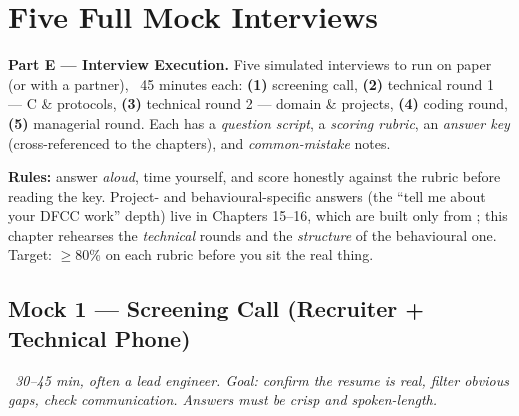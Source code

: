 \chapter{Five Full Mock Interviews}
\label{ch:mock-interviews}

\begin{partnote}
\textbf{Part E --- Interview Execution.} Five simulated interviews to run on
paper (or with a partner), ~45 minutes each: \textbf{(1)} screening call,
\textbf{(2)} technical round 1 --- C \& protocols, \textbf{(3)} technical round 2
--- domain \& projects, \textbf{(4)} coding round, \textbf{(5)} managerial round.
Each has a \emph{question script}, a \emph{scoring rubric}, an \emph{answer key}
(cross-referenced to the chapters), and \emph{common-mistake} notes.

\medskip
\textbf{Rules:} answer \emph{aloud}, time yourself, and score honestly against
the rubric before reading the key. Project- and behavioural-specific answers
(the ``tell me about your DFCC work'' depth) live in Chapters 15--16, which are
built only from ; this chapter rehearses the
\emph{technical} rounds and the \emph{structure} of the behavioural one. Target:
$\ge$80\% on each rubric before you sit the real thing.
\end{partnote}

\section{Mock 1 --- Screening Call (Recruiter + Technical Phone)}
\emph{~30--45 min, often a lead engineer. Goal: confirm the resume is real,
filter obvious gaps, check communication. Answers must be crisp and
spoken-length.}

